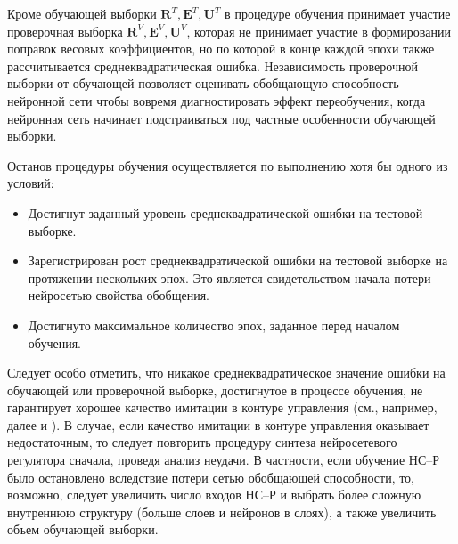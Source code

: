 Кроме обучающей выборки $\mathbf{R}^T,\mathbf{E}^T,\mathbf{U}^T$ в
процедуре обучения принимает участие проверочная выборка
$\mathbf{R}^V,\mathbf{E}^V,\mathbf{U}^V$, которая не принимает участие
в формировании поправок весовых коэффициентов, но по которой в конце
каждой эпохи также рассчитывается среднеквадратическая ошибка.
Независимость проверочной выборки от обучающей позволяет оценивать
обобщающую способность нейронной сети чтобы вовремя диагностировать
эффект переобучения, когда нейронная сеть начинает подстраиваться под
частные особенности обучающей выборки.

Останов процедуры обучения осуществляется по выполнению хотя бы одного
из условий:
\begin{itemize}
\item Достигнут заданный уровень среднеквадратической ошибки на
  тестовой выборке.
\item Зарегистрирован рост среднеквадратической ошибки на тестовой
  выборке на протяжении нескольких эпох.  Это является свидетельством
  начала потери нейросетью свойства обобщения.
\item Достигнуто максимальное количество эпох, заданное перед началом
  обучения.
\end{itemize}

Следует особо отметить, что никакое среднеквадратическое значение
ошибки на обучающей или проверочной выборке, достигнутое в процессе
обучения, не гарантирует хорошее качество имитации в контуре
управления (см., например, далее
 и
).  В случае, если качество
имитации в контуре управления оказывает недостаточным, то следует
повторить процедуру синтеза нейросетевого регулятора сначала, проведя
анализ неудачи.  В частности, если обучение НС--Р было остановлено
вследствие потери сетью обобщающей способности, то, возможно, следует
увеличить число входов НС--Р и выбрать более сложную внутреннюю
структуру (больше слоев и нейронов в слоях), а также увеличить объем
обучающей выборки.



